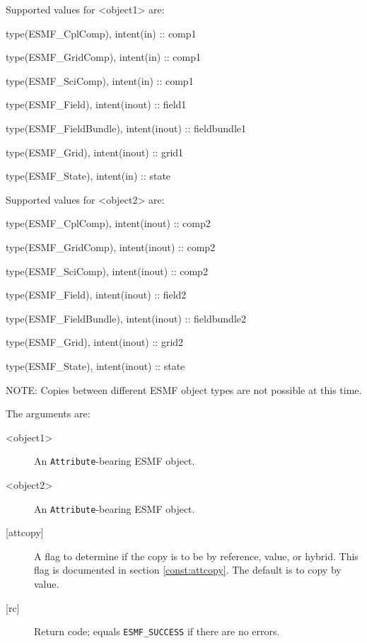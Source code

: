    Supported values for <object1> are:
   \begin{description}
   \item type(ESMF\_CplComp), intent(in) :: comp1
   \item type(ESMF\_GridComp), intent(in) :: comp1
   \item type(ESMF\_SciComp), intent(in) :: comp1
   \item type(ESMF\_Field), intent(inout) :: field1
   \item type(ESMF\_FieldBundle), intent(inout) :: fieldbundle1
   \item type(ESMF\_Grid), intent(inout) :: grid1
   \item type(ESMF\_State), intent(in) :: state
   \end{description}
  
   Supported values for <object2> are:
   \begin{description}
   \item type(ESMF\_CplComp), intent(inout) :: comp2
   \item type(ESMF\_GridComp), intent(inout) :: comp2
   \item type(ESMF\_SciComp), intent(inout) :: comp2
   \item type(ESMF\_Field), intent(inout) :: field2
   \item type(ESMF\_FieldBundle), intent(inout) :: fieldbundle2
   \item type(ESMF\_Grid), intent(inout) :: grid2
   \item type(ESMF\_State), intent(inout) :: state
   \end{description}
  
   NOTE: Copies between different ESMF object types are not possible at this time.
  
   The arguments are:
   \begin{description}
   \item [<object1>]
   An {\tt Attribute}-bearing ESMF object.
   \item [<object2>]
   An {\tt Attribute}-bearing ESMF object.
   \item [{[attcopy]}]
   A flag to determine if the copy is to be by reference, value,
   or hybrid. This flag is documented in section \ref{const:attcopy}.
   The default is to copy by value.
   \item [{[rc]}]
   Return code; equals {\tt ESMF\_SUCCESS} if there are no errors.
   \end{description}
   
 
